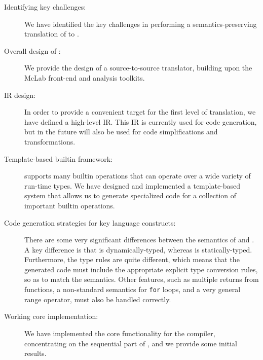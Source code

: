 \begin{description}

\item[Identifying key challenges:] We have identified the key challenges
in performing a semantics-preserving translation of \matlab to \xten.

\item[Overall design of \mixten:] We provide the design of a 
source-to-source translator, building upon the McLab front-end and
analysis toolkits.

\item[\mixten IR design:] In order to provide a convenient
target for the first level of translation, we have defined a high-level
\mixten IR.  This IR is currently used for code generation,  but in the
future will also be used for code simplifications and transformations.

\item[Template-based builtin framework:] \matlab supports many builtin
operations that can operate over a wide variety of run-time types.  We
have designed and implemented a template-based system that allows us to
generate specialized \xten code for a collection of important builtin
operations.

\item[Code generation strategies for key language constructs:]  There
are some very significant differences between the semantics of \matlab
and \xten.  A key difference is that \matlab is dynamically-typed,
whereas \xten is statically-typed.   Furthermore, the type rules are
quite different, which means that the generated \xten code must include
the appropriate explicit type conversion rules, so as to match the
\matlab semantics.   Other \matlab features, such as multiple returns
from functions, a non-standard semantics for \texttt{for} loops, and a
very general range operator, must also be handled correctly.

\item[Working core implementation:] We have implemented the core
functionality for the \mixten compiler, concentrating on the sequential
part of \xten, and we provide some initial results.

\end{description}
